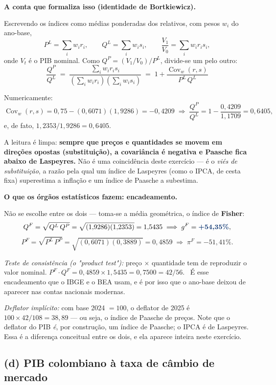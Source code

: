 \documentclass[11pt, a4paper]{article}
\newcommand{\passo}[1]{\medskip\noindent\textbf{#1}\par\nobreak}
\newcommand{\resp}[1]{\textcolor{darkblue}{\textbf{#1}}}
\DeclareMathOperator{\Cov}{Cov}
\begin{document}
\passo{A conta que formaliza isso (identidade de Bortkiewicz).} Escrevendo os índices como
médias ponderadas dos relativos, com pesos $w_i$ do ano-base,
$$P^{L} = \sum_i w_i r_i, \qquad Q^{L} = \sum_i w_i s_i, \qquad
\frac{V_1}{V_0} = \sum_i w_i r_i s_i,$$
onde $V_t$ é o PIB nominal. Como $Q^{P} = (V_1/V_0)/P^{L}$, divide-se um pelo outro:
$$\boxed{\;\frac{Q^{P}}{Q^{L}} \;=\;
\frac{\sum_i w_i r_i s_i}{\left(\sum_i w_i r_i\right)\left(\sum_i w_i s_i\right)}
\;=\; 1 + \frac{\Cov_w(r,s)}{P^{L}\, Q^{L}}\;}$$

Numericamente:
$$\Cov_w(r,s) = 0{,}75 - (0{,}6071)(1{,}9286) = -0{,}4209
\;\Longrightarrow\;
\frac{Q^{P}}{Q^{L}} = 1 - \frac{0{,}4209}{1{,}1709} = 0{,}6405,$$
e, de fato, $1{,}2353/1{,}9286 = 0{,}6405$. \checkmark

A leitura é limpa: \textbf{sempre que preços e quantidades se movem em direções opostas
(substituição), a covariância é negativa e Paasche fica abaixo de Laspeyres.} Não é uma
coincidência deste exercício --- é o \emph{viés de substituição}, a razão pela qual um
índice de Laspeyres (como o IPCA, de cesta fixa) superestima a inflação e um índice de
Paasche a subestima.

\passo{O que os órgãos estatísticos fazem: encadeamento.} Não se escolhe entre os dois
--- toma-se a média geométrica, o índice de \textbf{Fisher}:
$$Q^{F} = \sqrt{Q^{L}\, Q^{P}} = \sqrt{(1{,}9286)(1{,}2353)} = 1{,}5435
\;\Longrightarrow\; g^{F} = \resp{+54{,}35\%},$$
$$P^{F} = \sqrt{P^{L}\, P^{P}} = \sqrt{(0{,}6071)(0{,}3889)} = 0{,}4859
\;\Longrightarrow\; \pi^{F} = -51{,}41\%.$$

\emph{Teste de consistência (o "product test"):} preço $\times$ quantidade tem de reproduzir
o valor nominal. $P^{F} \cdot Q^{F} = 0{,}4859 \times 1{,}5435 = 0{,}7500 = 42/56$.
\checkmark\ É esse encadeamento que o IBGE e o BEA usam, e é por isso que o ano-base
deixou de aparecer nas contas nacionais modernas.

\emph{Deflator implícito:} com base 2024 $=100$, o deflator de 2025 é
$100 \times 42/108 = 38{,}89$ --- ou seja, o índice de Paasche de preços. Note que o
deflator do PIB \emph{é}, por construção, um índice de Paasche; o IPCA é de Laspeyres.
Essa é a diferença conceitual entre os dois, e ela aparece inteira neste exercício.

\subsection*{(d) PIB colombiano à taxa de câmbio de mercado}
\end{document}
